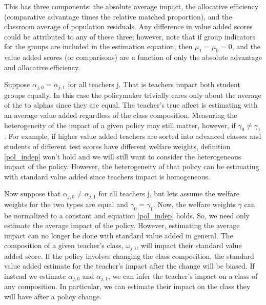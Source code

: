 \documentclass{article}
\theoremstyle{definition}
\theoremstyle{definition}
\theoremstyle{definition}
\theoremstyle{definition}
\begin{document}
    This has three components: the absolute average impact, the allocative efficiency (comparative advantage times the relative matched proportion), and the classroom average of population residuals. Any difference in value added scores could be attributed to any of these three; however, note that if group indicators for the groups are included in the estimation equation, then $\mu_1 = \mu_0 = 0$, and the value added scores (or comparisons) are a function of only the absolute advantage and allocative efficiency.
    
     Suppose $\alpha_{j,0} = \alpha_{j,1}$ for all teachers j. That is teachers impact both student groups equally. In this case the policymaker trivially cares only about the average of the to alphas since they are equal. The teacher's true affect is estimating with an average value added regardless of the class composition. Measuring the heterogeneity of the impact of a given policy may still matter, however, if $\gamma_0 \neq \gamma_1$. For example, if higher value added teachers are sorted into advanced classes and students of different test scores have different welfare weights, definition \ref{pol_indep} won't hold and we will still want to consider the heterogeneous impact of the policy. However, the heterogeneity of that policy can be estimating with standard value added since teachers impact is homogeneous. 
     
    Now suppose that $\alpha_{j,0} \neq \alpha_{j,1}$ for all teachers j, but lets assume the welfare weights for the two types are equal and $\gamma_0 = \gamma_1$. Now, the welfare weights $\gamma$ can be normalized to a constant and equation \ref{pol_indep} holds. So, we need only estimate the average impact of the policy. However, estimating the average impact can no longer be done with standard value added in general. The composition of a given teacher's class, $\omega_{j,i}$, will impact their standard value added score. If the policy involves changing the class composition, the standard value added estimate for the teacher's impact after the change will be biased. If instead we estimate $\alpha_{j,0}$ and $\alpha_{j,1}$, we can infer the teacher's impact on a class of any composition. In particular, we can estimate their impact on the class they will have after a policy change. 
    
\end{document}
